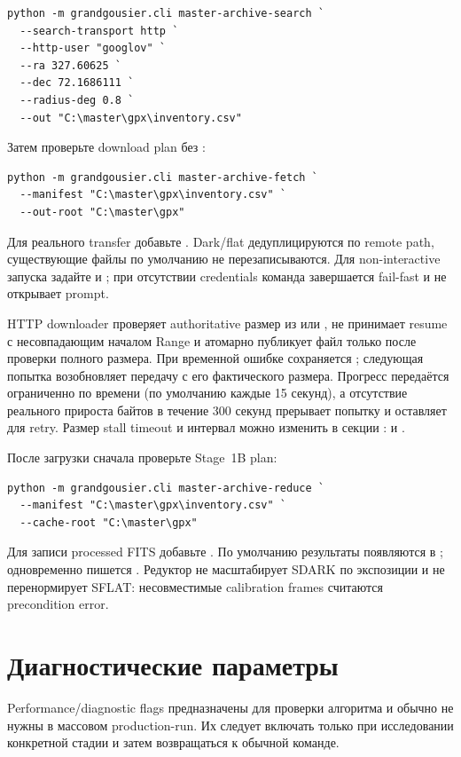 \begin{lstlisting}
python -m grandgousier.cli master-archive-search `
  --search-transport http `
  --http-user "googlov" `
  --ra 327.60625 `
  --dec 72.1686111 `
  --radius-deg 0.8 `
  --out "C:\master\gpx\inventory.csv"
\end{lstlisting}

Затем проверьте download plan без :

\begin{lstlisting}
python -m grandgousier.cli master-archive-fetch `
  --manifest "C:\master\gpx\inventory.csv" `
  --out-root "C:\master\gpx"
\end{lstlisting}

Для реального transfer добавьте . Dark/flat дедуплицируются по remote path, существующие файлы по умолчанию не перезаписываются. Для non-interactive запуска задайте  и ; при отсутствии credentials команда завершается fail-fast и не открывает prompt.

HTTP downloader проверяет authoritative размер из  или , не принимает resume с несовпадающим началом Range и атомарно публикует файл только после проверки полного размера. При временной ошибке сохраняется ; следующая попытка возобновляет передачу с его фактического размера. Прогресс передаётся ограниченно по времени (по умолчанию каждые 15 секунд), а отсутствие реального прироста байтов в течение 300 секунд прерывает попытку и оставляет  для retry. Размер stall timeout и интервал можно изменить в секции :  и .


После загрузки сначала проверьте Stage~1B plan:

\begin{lstlisting}
python -m grandgousier.cli master-archive-reduce `
  --manifest "C:\master\gpx\inventory.csv" `
  --cache-root "C:\master\gpx"
\end{lstlisting}

Для записи processed FITS добавьте . По умолчанию результаты появляются в ; одновременно пишется . Редуктор не масштабирует SDARK по экспозиции и не перенормирует SFLAT: несовместимые calibration frames считаются precondition error.

\section{Диагностические параметры}

Performance/diagnostic flags предназначены для проверки алгоритма и обычно не нужны в массовом production-run. Их следует включать только при исследовании конкретной стадии и затем возвращаться к обычной команде.
